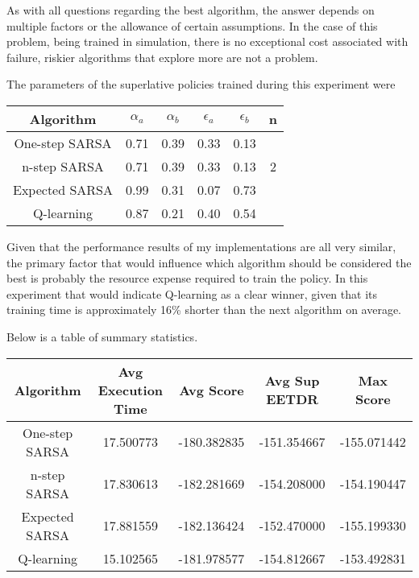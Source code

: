 \documentclass[12pt,letterpaper]{exam}
\begin{document}
\begin{questions}
\begin{solution}
    As with all questions regarding the best algorithm, the answer depends on multiple factors
    or the allowance of certain assumptions.
    In the case of this problem, being trained in simulation, there is no exceptional cost 
    associated with failure, riskier algorithms that explore more are not a problem.

    The parameters of the superlative policies trained during this experiment were
    \begin{center}
        \begin{tabular}{c cccc c}
            Algorithm & \(\alpha_a\) & \(\alpha_b\) & \(\epsilon_a\) & \(\epsilon_b\) & n \\
            \midrule
            One-step SARSA & 0.71 & 0.39 & 0.33 & 0.13 &  \\
            n-step SARSA   & 0.71 & 0.39 & 0.33 & 0.13 & 2 \\
            Expected SARSA & 0.99 & 0.31 & 0.07 & 0.73 &  \\
            Q-learning     & 0.87 & 0.21 & 0.40 & 0.54 &  \\
            \bottomrule
        \end{tabular}
    \end{center}

    Given that the performance results of my implementations are all very similar,
    the primary factor that would influence which algorithm should be considered the best
    is probably the resource expense required to train the policy.
    In this experiment that would indicate Q-learning as a clear winner, given that its training
    time is approximately 16\% shorter than the next algorithm on average.

    Below is a table of summary statistics.
    \begin{center}
        \begin{tabular}{ccccc}
            Algorithm & Avg Execution Time & Avg Score & Avg Sup EETDR & Max Score \\
            \midrule
            One-step SARSA & 17.500773 & -180.382835 & -151.354667 & -155.071442 \\
            n-step SARSA   & 17.830613 & -182.281669 & -154.208000 & -154.190447 \\
            Expected SARSA & 17.881559 & -182.136424 & -152.470000 & -155.199330 \\
            Q-learning     & 15.102565 & -181.978577 & -154.812667 & -153.492831 \\
            \bottomrule
        \end{tabular}
    \end{center}


\end{solution}
\end{questions}
\end{document}

